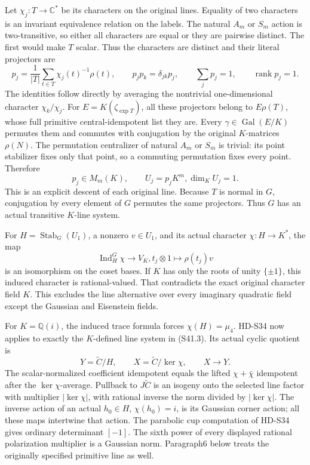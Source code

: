 Let \(\chi_j:T\to\mathbb C^*\) be its characters on
the original lines. Equality of two characters is an invariant
equivalence relation on the labels. The natural \(A_m\)
or \(S_m\) action is two-transitive, so either all characters
are equal or they are pairwise distinct. The first would make
\(T\) scalar. Thus the characters are distinct and their
literal projectors are
\[
 p_j=\frac1{|T|}\sum_{t\in T}\chi_j(t)^{-1}\rho(t),
 \qquad p_jp_k=\delta_{jk}p_j,\qquad
 \sum_jp_j=1,\qquad\operatorname{rank}p_j=1.             \tag{S41.1}
\]
The identities follow directly by averaging the nontrivial
one-dimensional character \(\chi_k/\chi_j\).
For \(E=K(\zeta_{\exp T})\), all these projectors belong
to \(E\rho(T)\), whose full primitive central-idempotent
list they are. Every \(\gamma\in\operatorname{Gal}(E/K)\)
permutes them and commutes with conjugation by the original
\(K\)-matrices \(\rho(N)\). The permutation centralizer
of natural \(A_m\) or \(S_m\) is trivial: its point
stabilizer fixes only that point, so a commuting permutation
fixes every point. Therefore
\[
          p_j\in M_m(K),\qquad U_j=p_jK^m,
                    \dim_KU_j=1.                          \tag{S41.2}
\]
This is an explicit descent of each original line. Because
\(T\) is normal in \(G\), conjugation by every element
of \(G\) permutes the same projectors. Thus \(G\) has
an actual transitive \(K\)-line system.

For \(H=\operatorname{Stab}_G(U_1)\), a nonzero
\(v\in U_1\), and its actual character
\(\chi:H\to K^*\), the map
\[
 \operatorname{Ind}_H^G\chi\longrightarrow V_K,
       t_j\otimes1\longmapsto\rho(t_j)v                  \tag{S41.3}
\]
is an isomorphism on the coset bases. If \(K\) has only
the roots of unity \(\{\pm1\}\), this induced character
is rational-valued. That contradicts the exact original
character field \(K\). This excludes the line alternative
over every imaginary quadratic field except the Gaussian and
Eisenstein fields.

For \(K=\mathbb Q(i)\), the induced trace formula forces
\(\chi(H)=\mu_4\). HD-S34 now applies to exactly the
\(K\)-defined line system in (S41.3). Its actual cyclic
quotient is
\[
 Y=\widetilde C/H,\qquad
 X=\widetilde C/\ker\chi,\qquad X\longrightarrow Y.
                                                               \tag{S41.4}
\]
The scalar-normalized coefficient idempotent equals the lifted
\(\chi+\bar\chi\) idempotent after the
\(\ker\chi\)-average. Pullback to \(J\widetilde C\)
is an isogeny onto the selected line factor with multiplier
\(|\ker\chi|\), with rational inverse the norm divided by
\(|\ker\chi|\). The inverse action of an actual
\(h_0\in H\), \(\chi(h_0)=i\), is its Gaussian corner
action; all these maps intertwine that action. The parabolic
cup computation of HD-S34 gives ordinary determinant \([-1]\).
The sixth power of every displayed rational polarization
multiplier is a Gaussian norm. Paragraph6 below treats the
originally specified primitive line as well.

